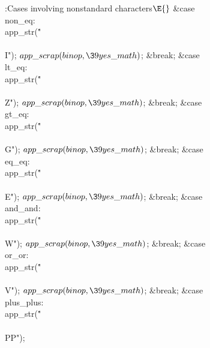\Y\B\4:Cases involving nonstandard characters\X${}\E{}$\6
\4\hbox{\1\quad}\&{case} \\{non\_eq}:\5
\\{app\_str}(\.{"\\\\I"});\5
${}\\{app\_scrap}(\\{binop},\39\\{yes\_math}){}$;\5
\&{break};\6
\4\&{case} \\{lt\_eq}:\5
\\{app\_str}(\.{"\\\\Z"});\5
${}\\{app\_scrap}(\\{binop},\39\\{yes\_math}){}$;\5
\&{break};\6
\4\&{case} \\{gt\_eq}:\5
\\{app\_str}(\.{"\\\\G"});\5
${}\\{app\_scrap}(\\{binop},\39\\{yes\_math}){}$;\5
\&{break};\6
\4\&{case} \\{eq\_eq}:\5
\\{app\_str}(\.{"\\\\E"});\5
${}\\{app\_scrap}(\\{binop},\39\\{yes\_math}){}$;\5
\&{break};\6
\4\&{case} \\{and\_and}:\5
\\{app\_str}(\.{"\\\\W"});\5
${}\\{app\_scrap}(\\{binop},\39\\{yes\_math}){}$;\5
\&{break};\6
\4\&{case} \\{or\_or}:\5
\\{app\_str}(\.{"\\\\V"});\5
${}\\{app\_scrap}(\\{binop},\39\\{yes\_math}){}$;\5
\&{break};\6
\4\&{case} \\{plus\_plus}:\5
\\{app\_str}(\.{"\\\\PP"});\5
